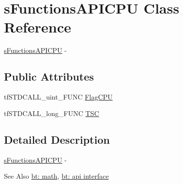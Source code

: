 \hypertarget{structs_functions_a_p_i_c_p_u}{\section{s\-Functions\-A\-P\-I\-C\-P\-U Class Reference}
\label{structs_functions_a_p_i_c_p_u}
}


\hyperlink{structs_functions_a_p_i_c_p_u}{s\-Functions\-A\-P\-I\-C\-P\-U} -\/  


\subsection*{Public Attributes}
\begin{DoxyCompactItemize}
\item 
tf\-S\-T\-D\-C\-A\-L\-L\-\_\-uint\-\_\-\-F\-U\-N\-C \hyperlink{structs_functions_a_p_i_c_p_u_ab1c61ff3aee9a874c17d59b20c2c271a}{Flag\-C\-P\-U}
\item 
tf\-S\-T\-D\-C\-A\-L\-L\-\_\-long\-\_\-\-F\-U\-N\-C \hyperlink{structs_functions_a_p_i_c_p_u_ac0aa0c19a2331cf952d15fcb7b184788}{T\-S\-C}
\end{DoxyCompactItemize}


\subsection{Detailed Description}
\hyperlink{structs_functions_a_p_i_c_p_u}{s\-Functions\-A\-P\-I\-C\-P\-U} -\/ 

\begin{DoxySeeAlso}{See Also}
\hyperlink{group__math}{bt\-: math}, \hyperlink{group__apiinterface}{bt\-: api interface} 
\end{DoxySeeAlso}


